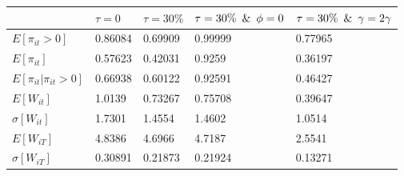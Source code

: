 \begin{tabular}{lllll}
& $\tau =0$ & $\tau =30\%$ & $\tau =30\% \hspace{0.5em}\& \hspace{0.5em} \phi = 0$ & $\tau =30\% \hspace{0.5em}\& \hspace{0.5em} \gamma = 2\gamma$ \\ 
\hline 
$E[\pi_{it}>0]$ & 0.86084 & 0.69909 & 0.99999 & 0.77965 \\ 
$E[\pi_{it}]$ & 0.57623 & 0.42031 & 0.9259 & 0.36197 \\ 
$E[\pi_{it}|\pi_{it}>0]$ & 0.66938 & 0.60122 & 0.92591 & 0.46427 \\ 
$E[W_{it}]$ & 1.0139 & 0.73267 & 0.75708 & 0.39647 \\ 
$\sigma[W_{it}]$ & 1.7301 & 1.4554 & 1.4602 & 1.0514 \\ 
$E[W_{iT}]$ & 4.8386 & 4.6966 & 4.7187 & 2.5541 \\ 
$\sigma[W_{iT}]$ & 0.30891 & 0.21873 & 0.21924 & 0.13271 \\ 
\hline 
\end{tabular}